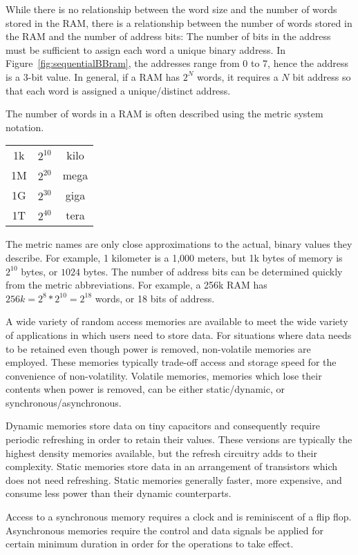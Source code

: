 While there is no relationship between the word size and the number of
words stored in the RAM, there is a relationship between the number
of words stored in the RAM and the number of address bits:
The number of bits in the address must be sufficient to assign
each word a unique binary address.  In Figure~\ref{fig:sequentialBBram}, the
addresses range from 0 to 7, hence the address is a 3-bit value.   In general,
if a RAM has $2^N$ words, it requires a  $N$ bit address so that each word
is assigned a unique/distinct address.

The number of words in a RAM is often described using the metric system notation.

\begin{tabular}{ccc}
1k & $2^{10}$ & kilo \\
1M & $2^{20}$ & mega \\
1G & $2^{30}$ & giga \\
1T & $2^{40}$ & tera \\
\end{tabular}

The metric names are only close approximations to the actual, binary values
they describe.  For example, 1 kilometer is a 1,000 meters, but
1k bytes of memory is $2^{10}$ bytes, or $1024$ bytes.  The number of
address bits can be determined quickly from the metric abbreviations.
For example, a 256k RAM has $256k=2^8*2^{10}=2^{18}$ words, or 18 bits
of address.

A wide variety of random access memories are available to meet the wide
variety of applications in which users need to store data.  For situations where
data needs to be retained even though power is removed, non-volatile memories are employed.
These memories typically trade-off access and storage speed for the
convenience of non-volatility.  Volatile memories, memories which lose
their contents when power is removed, can be either static/dynamic, or
synchronous/asynchronous.

Dynamic memories store data on tiny capacitors and
consequently require periodic refreshing in order to retain their values.  These versions
are typically the highest density memories available, but the refresh circuitry
adds to their complexity.  Static memories store data in an arrangement
of transistors which does not need refreshing.  Static memories generally
faster, more expensive, and consume less power than their dynamic counterparts.

Access to a synchronous memory requires a clock and is reminiscent of a flip flop.
Asynchronous memories require the control and data signals be applied
for certain minimum duration in order for the operations to take effect.

